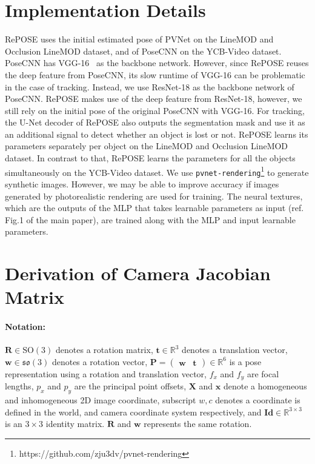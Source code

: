 \documentclass[10pt,twocolumn,letterpaper]{article}
\begin{document}
\section{Implementation Details}
RePOSE uses the initial estimated pose of PVNet on the LineMOD and Occlusion LineMOD dataset, and of PoseCNN on the YCB-Video dataset. PoseCNN has VGG-16~\cite{Simonyan15} as the backbone network. However, since RePOSE reuses the deep feature from PoseCNN, its slow runtime of VGG-16 can be problematic in the case of tracking. Instead, we use ResNet-18 as the backbone network of PoseCNN. RePOSE makes use of the deep feature from ResNet-18, however, we still rely on the initial pose of the original PoseCNN with VGG-16. For tracking, the U-Net decoder of RePOSE also outputs the segmentation mask and use it as an additional signal to detect whether an object is lost or not. RePOSE learns its parameters separately per object on the LineMOD and Occlusion LineMOD dataset. In contrast to that, RePOSE learns the parameters for all the objects simultaneously on the YCB-Video dataset. We use \texttt{pvnet-rendering}\footnote{https://github.com/zju3dv/pvnet-rendering} to generate synthetic images. However, we may be able to improve accuracy if images generated by photorealistic rendering are used for training. The neural textures, which are the outputs of the MLP that takes learnable parameters as input (ref. Fig.1 of the main paper), are trained along with the MLP and input learnable parameters.

\section{Derivation of Camera Jacobian Matrix}

\paragraph{Notation:}
$\mathbf{R} \in \text{SO}(3)$ denotes a rotation matrix, $\mathbf{t} \in \mathbb{R}^{3}$ denotes a translation vector, $\mathbf{w} \in \mathfrak{so}(3)$ denotes a rotation vector, $\mathbf{P} = \begin{pmatrix}
  \mathbf{w} & \mathbf{t}
\end{pmatrix} \in \mathbb{R}^{6}$ is a pose representation using a rotation and translation vector, $f_x$ and $f_y$ are focal lengths, $p_x$ and $p_y$ are the principal point offsets, $\mathbf{X}$ and $\mathbf{x}$ denote a homogeneous and inhomogeneous 2D image coordinate, subscript $w, c$ denotes a coordinate is defined in the world, and camera coordinate system respectively, and $\mathbf{Id} \in \mathbb{R}^{3 \times 3}$ is an $3 \times 3$ identity matrix.
$\mathbf{R}$ and $\mathbf{w}$ represents the same rotation.
\end{document}
